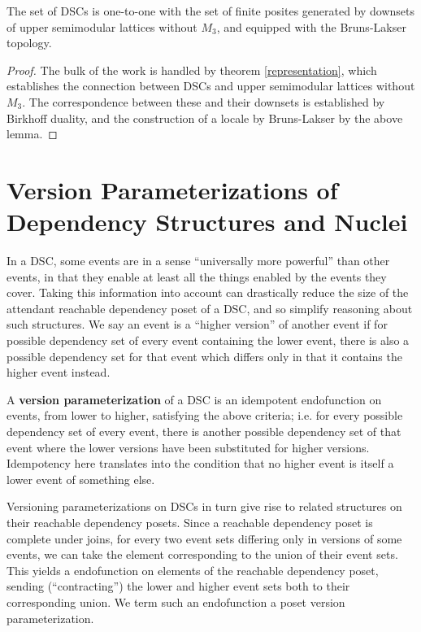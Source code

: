 \documentclass[a4paper,USenglish,cleveref, autoref, thm-restate,authorcolumns]{lipics-v2019}
\begin{document}
\begin{theorem}
The set of DSCs is one-to-one with the set of finite posites generated by downsets of upper semimodular lattices without \(M_3\), and equipped with the Bruns-Lakser topology.
\end{theorem}
\begin{proof}
The bulk of the work is handled by theorem \ref{representation}, which establishes the connection between DSCs and upper semimodular lattices without \(M_3\). The correspondence between these and their downsets is established by Birkhoff duality, and the construction of a locale by Bruns-Lakser by the above lemma.
\end{proof}

\section{Version Parameterizations of Dependency Structures and Nuclei}

In a DSC, some events are in a sense ``universally more powerful'' than other events, in that they enable at least all the things enabled by the events they cover. Taking this information into account can drastically reduce the size of the attendant reachable dependency poset of a DSC, and so simplify reasoning about such structures. We say an event is a ``higher version'' of another event if for possible dependency set of every event containing the lower event, there is also a possible dependency set for that event which differs only in that it contains the higher event instead.

\begin{definition}
A \textbf{version parameterization} of a DSC is an idempotent endofunction on events, from lower to higher, satisfying the above criteria; i.e. for every possible dependency set of every event, there is another possible dependency set of that event where the lower versions have been substituted for higher versions. Idempotency here translates into the condition that no higher event is itself a lower event of something else.
\end{definition}

Versioning parameterizations on DSCs in turn give rise to related structures on their reachable dependency posets. Since a reachable dependency poset is complete under joins, for every two event sets differing only in versions of some events, we can take the element corresponding to the union of their event sets. This yields a  endofunction on elements of the reachable dependency poset, sending (``contracting'') the lower and higher event sets both to their corresponding union. We term such an endofunction a poset version parameterization.
\end{document}
